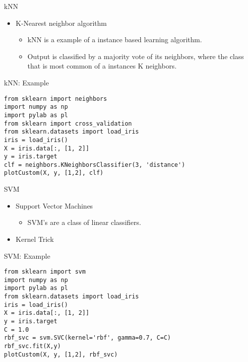 \begin{frame}{kNN}

\begin{itemize}
\itemsep1pt\parskip0pt
\item
  K-Nearest neighbor algorithm

  \begin{itemize}
  \itemsep1pt\parskip0pt
  \item
    kNN is a example of a instance based learning algorithm.
  \item
    Output is classified by a majority vote of its neighbors, where the
    class that is most common of a instances K neighbors.
  \end{itemize}
\end{itemize}

\end{frame}

\begin{frame}[fragile]{kNN: Example}

\begin{verbatim}
from sklearn import neighbors
import numpy as np
import pylab as pl
from sklearn import cross_validation
from sklearn.datasets import load_iris
iris = load_iris()
X = iris.data[:, [1, 2]]
y = iris.target
clf = neighbors.KNeighborsClassifier(3, 'distance')
plotCustom(X, y, [1,2], clf)
\end{verbatim}

\end{frame}

\begin{frame}{SVM}

\begin{itemize}
\itemsep1pt\parskip0pt
\item
  Support Vector Machines

  \begin{itemize}
  \itemsep1pt\parskip0pt
  \item
    SVM's are a class of linear classifiers.
  \end{itemize}
\item
  Kernel Trick
\end{itemize}

\end{frame}

\begin{frame}[fragile]{SVM: Example}

\begin{verbatim}
from sklearn import svm
import numpy as np
import pylab as pl
from sklearn.datasets import load_iris
iris = load_iris()
X = iris.data[:, [1, 2]]
y = iris.target
C = 1.0
rbf_svc = svm.SVC(kernel='rbf', gamma=0.7, C=C)
rbf_svc.fit(X,y)
plotCustom(X, y, [1,2], rbf_svc)
\end{verbatim}

\end{frame}

